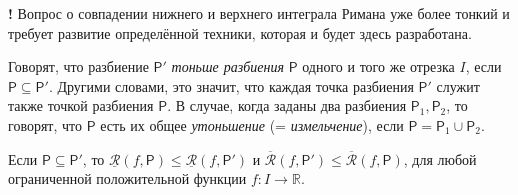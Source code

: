 \begin{mydanger}{\bf !}
    Вопрос о совпадении нижнего и верхнего интеграла Римана уже более тонкий и требует развитие определённой техники, которая и будет здесь разработана.
\end{mydanger}

\begin{definition}
    Говорят, что разбиение $\mathsf{P}'$ \textit{тоньше разбиения} $\mathsf{P}$ одного и того же отрезка $I$, если $\mathsf{P} \subseteq \mathsf{P}'$. Другими словами, это значит, что каждая точка разбиения $\mathsf{P}'$ служит также точкой разбиения $\mathsf{P}$. В случае, когда заданы два разбиения $\mathsf{P}_1, \mathsf{P}_2$, то говорят, что $\mathsf{P}$ есть их общее \textit{утоньшение} (= \textit{измельчение}), если $\mathsf{P } = \mathsf{P}_1 \cup \mathsf{P}_2.$
\end{definition}


\begin{proposition}\label{R<R'}
    Если $ \mathsf{P} \subseteq \mathsf{P}'$, то $\underline{\mathcal{R}}(f,\mathsf{P}) \le \underline{\mathcal{R}}(f,\mathsf{P}')$ и $\overline{\mathcal{R}}(f,\mathsf{P}') \le \overline{\mathcal{R}}(f,\mathsf{P})$, для любой ограниченной положительной функции $f: I \to \mathbb{R}.$
\end{proposition}

